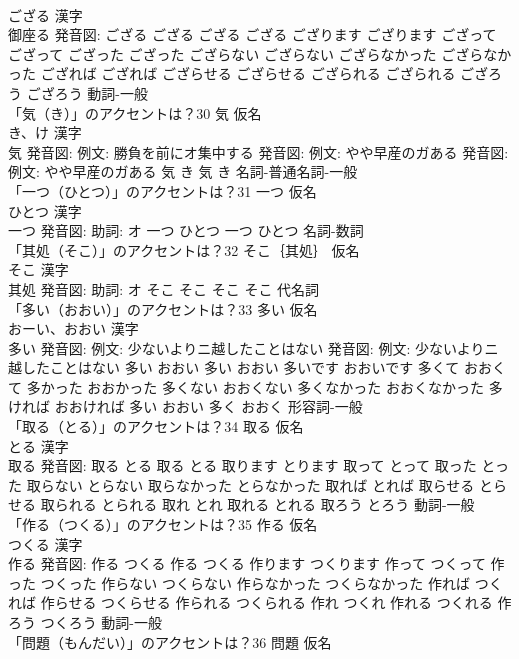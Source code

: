 \documentclass[8pt]{extreport}
\begin{document}
\begin{CJK}{UTF8}{min}
\\	ござる 漢字　
\\	御座る 発音図:	ござる ござる		ござる ござる ござります ござります ござって ござって ござった ござった ござらない ござらない ござらなかった ござらなかった ござれば ござれば ござらせる ござらせる ござられる ござられる ござろう ござろう				動詞-一般 
\\	「気（き）」のアクセントは？30	気 仮名　
\\	き、け 漢字　
\\	気 発音図: 例文: 勝負を前にオ集中する 発音図: 例文: やや早産のガある 発音図: 例文: やや早産のガある	気 き		気 き				名詞-普通名詞-一般 
\\	「一つ（ひとつ）」のアクセントは？31	一つ 仮名　
\\	ひとつ 漢字　
\\	一つ 発音図: 助詞: オ	一つ ひとつ		一つ ひとつ				名詞-数詞 
\\	「其処（そこ）」のアクセントは？32	そこ｛其処｝ 仮名　
\\	そこ 漢字　
\\	其処 発音図: 助詞: オ	そこ そこ		そこ そこ				代名詞 
\\	「多い（おおい）」のアクセントは？33	多い 仮名　
\\	おーい、おおい 漢字　
\\	多い 発音図: 例文: 少ないよりニ越したことはない 発音図: 例文: 少ないよりニ越したことはない	多い おおい		多い おおい 多いです おおいです 多くて おおくて 多かった おおかった 多くない おおくない 多くなかった おおくなかった 多ければ おおければ 多い おおい 多く おおく				形容詞-一般 
\\	「取る（とる）」のアクセントは？34	取る 仮名　
\\	とる 漢字　
\\	取る 発音図:	取る とる		取る とる 取ります とります 取って とって 取った とった 取らない とらない 取らなかった とらなかった 取れば とれば 取らせる とらせる 取られる とられる 取れ とれ 取れる とれる 取ろう とろう				動詞-一般 
\\	「作る（つくる）」のアクセントは？35	作る 仮名　
\\	つくる 漢字　
\\	作る 発音図:	作る つくる		作る つくる 作ります つくります 作って つくって 作った つくった 作らない つくらない 作らなかった つくらなかった 作れば つくれば 作らせる つくらせる 作られる つくられる 作れ つくれ 作れる つくれる 作ろう つくろう				動詞-一般 
\\	「問題（もんだい）」のアクセントは？36	問題 仮名　

\end{CJK}
\end{document}
